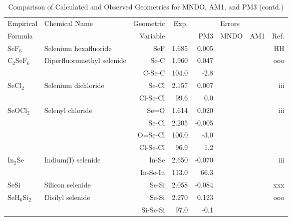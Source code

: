\begin{table}
\caption{\label{geotabx}Comparison of Calculated and Observed Geometries for 
MNDO, AM1, and PM3 (contd.)}
\begin{center}
\compresstable
\begin{tabular}{llrrrrrr}
 Empirical  & Chemical Name &  Geometric &  Exp. & \multicolumn{3}{c}{Errors} & \\
  Formula   &               &  Variable &        & PM3  & MNDO  &  AM1 & Ref.\\
\hline
 SeF$_6$        & Selenium hexafluoride              &SeF            &     1.685   &     0.005 &  &  &    HH \\
 C$_2$SeF$_6$      & Diperfluoromethyl selenide         &Se-C           &     1.960   &     0.047 &  &  &   ooo \\
             &                                    &C-Se-C       &     104.0   &      -2.8 &  &    &       \\
 SeCl$_2$       & Selenium dichloride                &Se-Cl          &     2.157   &     0.007 &  &  &   iii \\
             &                                    &Cl-Se-Cl     &      99.6   &       0.0 &  &    &       \\
 SeOCl$_2$      & Selenyl chloride                   &Se=O           &     1.614   &     0.020 &  &  &   iii \\
             &                                    &Se-Cl          &     2.205   &    -0.005 &  &  &       \\
             &                                    &O=Se-Cl      &     106.0   &      -3.0 &  &    &       \\
             &                                    &Cl-Se-Cl     &      96.9   &       1.2 &  &    &       \\
 In$_2$Se       & Indium(I) selenide                 &In-Se          &     2.650   &    -0.070 &  &  &   iii \\
             &                                    &In-Se-In     &     113.0   &      66.3 &  &    &       \\
 SeSi        & Silicon selenide                   &Se-Si          &     2.058   &    -0.084 &  &  &   xxx \\
 SeH$_6$Si$_2$     & Disilyl selenide                   &Se-Si          &     2.270   &     0.123 &  &  &   ooo \\
             &                                    &Si-Se-Si     &      97.0   &      -0.1 &  &    &       \\

\end{tabular}
\end{center}
\end{table}
